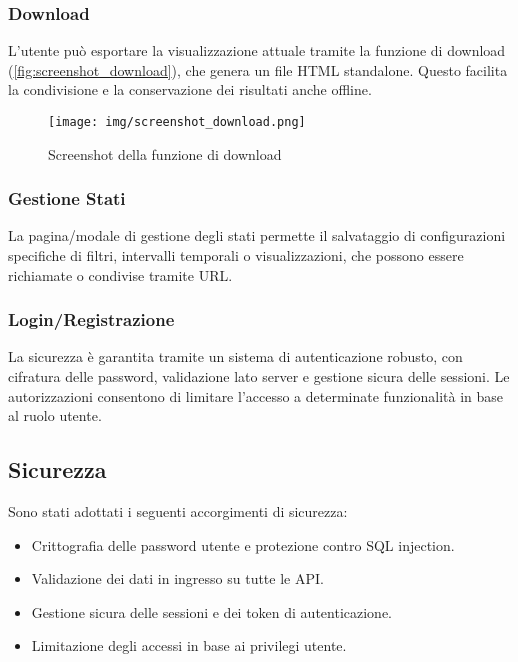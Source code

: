 \subsubsection{Download}

L’utente può esportare la visualizzazione attuale tramite la funzione di download (\autoref{fig:screenshot_download}), che genera un file HTML standalone. Questo facilita la condivisione e la conservazione dei risultati anche offline.

\vspace{0.5cm}
\begin{figure}[h!]
    \centering
    \texttt{[image: img/screenshot\_download.png]}
    \caption{Screenshot della funzione di download}
    \label{fig:screenshot_download}
\end{figure}
\vspace{0.5cm}

\subsubsection{Gestione Stati}

La pagina/modale di gestione degli stati permette il salvataggio di configurazioni specifiche di filtri, intervalli temporali o visualizzazioni, che possono essere richiamate o condivise tramite URL.

\subsubsection{Login/Registrazione}

La sicurezza è garantita tramite un sistema di autenticazione robusto, con cifratura delle password, validazione lato server e gestione sicura delle sessioni. Le autorizzazioni consentono di limitare l’accesso a determinate funzionalità in base al ruolo utente.

\subsection{Sicurezza}

Sono stati adottati i seguenti accorgimenti di sicurezza:
\begin{itemize}
    \item Crittografia delle password utente e protezione contro SQL injection.
    \item Validazione dei dati in ingresso su tutte le API.
    \item Gestione sicura delle sessioni e dei token di autenticazione.
    \item Limitazione degli accessi in base ai privilegi utente.
\end{itemize}

